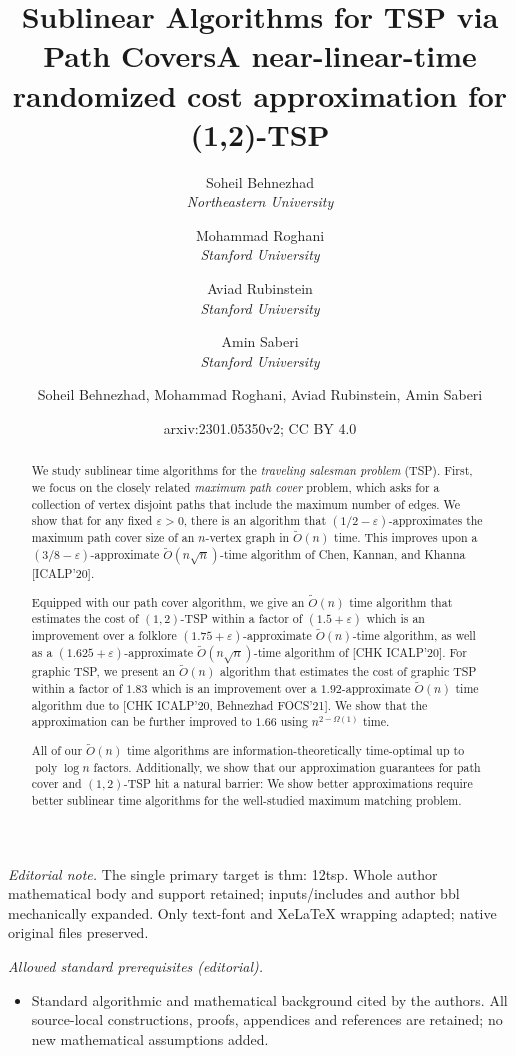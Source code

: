 \documentclass[letterpaper,11pt]{article}
\title{Sublinear Algorithms for TSP via Path Covers}
\author{
 Soheil Behnezhad\\{\em Northeastern University} \and 
 Mohammad Roghani\\{\em Stanford University} \and
 Aviad Rubinstein\\{\em Stanford University} \and
 Amin Saberi\\{\em Stanford University}
 }
\date{}
\title{A near-linear-time randomized cost approximation for (1,2)-TSP}
\author{Soheil Behnezhad, Mohammad Roghani, Aviad Rubinstein, Amin Saberi}
\date{arxiv:2301.05350v2; CC BY 4.0}
\renewcommand{\epsilon}{\varepsilon}
\DeclareMathOperator{\poly}{poly}
\begin{document}
\maketitle
\noindent\textit{Editorial note.} The single primary target is thm: 12tsp. Whole author mathematical body and support retained; inputs/includes and author bbl mechanically expanded. Only text-font and XeLaTeX wrapping adapted; native original files preserved.\par\medskip
\noindent\textit{Allowed standard prerequisites (editorial).}\begin{itemize}
\item Standard algorithmic and mathematical background cited by the authors. All source-local constructions, proofs, appendices and references are retained; no new mathematical assumptions added.
\end{itemize}\medskip

\begin{abstract}
We study sublinear time algorithms for the {\em traveling salesman problem} (TSP). First, we focus on the closely related {\em maximum path cover} problem, which asks for a collection of vertex disjoint paths that include the maximum number of edges. We show that for any fixed $\epsilon > 0$, there is an algorithm that $(1/2 - \epsilon)$-approximates the maximum path cover size of an $n$-vertex graph in $\widetilde{O}(n)$ time. This improves upon a $(3/8-\epsilon)$-approximate $\widetilde{O}(n \sqrt{n})$-time algorithm of Chen, Kannan, and Khanna [ICALP'20].
    
    \medskip
    Equipped with our path cover algorithm, we give an $\widetilde{O}(n)$ time algorithm that estimates the cost of $(1,2)$-TSP within a factor of $(1.5+\epsilon)$ which is an improvement over a folklore $(1.75 + \epsilon)$-approximate $\widetilde{O}(n)$-time algorithm, as well as a $(1.625+\epsilon)$-approximate $\widetilde{O}(n\sqrt{n})$-time algorithm of [CHK ICALP'20]. For graphic TSP, we present an $\widetilde{O}(n)$ algorithm that estimates the cost of graphic TSP within a factor of $1.83$ which is an improvement over a $1.92$-approximate $\widetilde{O}(n)$ time algorithm due to [CHK ICALP'20, Behnezhad FOCS'21]. We show that the approximation can be further improved to $1.66$ using $n^{2-\Omega(1)}$ time.
    
    \medskip    
    All of our $\widetilde{O}(n)$ time algorithms are information-theoretically time-optimal up to $\poly\log n$ factors. Additionally, we show that our approximation guarantees for path cover and $(1,2)$-TSP hit a natural barrier: We show better approximations require better sublinear time algorithms for the well-studied maximum matching problem.
\end{abstract}
\end{document}
